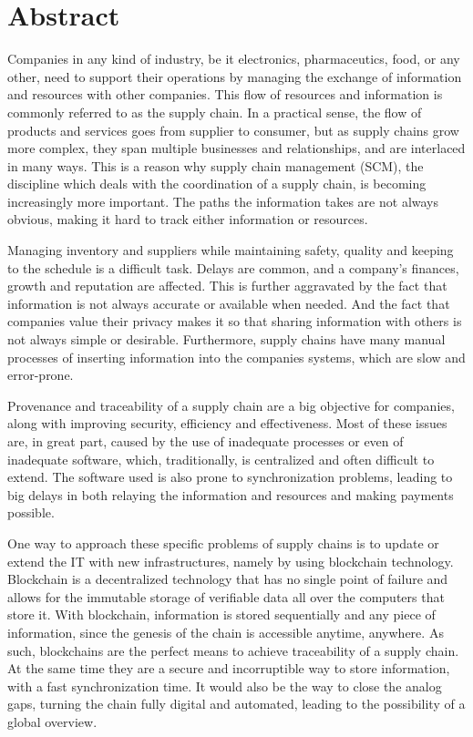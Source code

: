 \chapter{Abstract}
Companies in any kind of industry, be it electronics, pharmaceutics, food, or any other, need to support their operations by managing the exchange of information and resources with other companies. This flow of resources and information is commonly referred to as the supply chain. In a practical sense, the flow of products and services goes from supplier to consumer, but as supply chains grow more complex, they span multiple businesses and relationships, and are interlaced in many ways. This is a reason why supply chain management (SCM), the discipline which deals with the coordination of a supply chain, is becoming increasingly more important. The paths the information takes are not always obvious, making it hard to track either information or resources.

Managing inventory and suppliers while maintaining safety, quality and keeping to the schedule is a difficult task. Delays are common, and a company’s finances, growth and reputation are affected. This is further aggravated by the fact that information is not always accurate or available when needed. And the fact that companies value their privacy makes it so that sharing information with others is not always simple or desirable. Furthermore, supply chains have many manual processes of inserting information into the companies systems, which are slow and error-prone.

Provenance and traceability of a supply chain are a big objective for companies, along with improving security, efficiency and effectiveness. Most of these issues are, in great part, caused by the use of inadequate processes or even of inadequate software, which, traditionally, is centralized and often difficult to extend. The software used is also prone to synchronization problems, leading to big delays in both relaying the information and resources and making payments possible. 

One way to approach these specific problems of supply chains is to update or extend the IT with new infrastructures, namely by using blockchain technology. Blockchain is a decentralized technology that has no single point of failure and allows for the immutable storage of verifiable data all over the computers that store it. With blockchain, information is stored sequentially and any piece of information, since the genesis of the chain is accessible anytime, anywhere. As such, blockchains are the perfect means to achieve traceability of a supply chain. At the same time they are a secure and incorruptible way to store information, with a fast synchronization time. It would also be the way to close the analog gaps, turning the chain fully digital and automated, leading to the possibility of a global overview.

